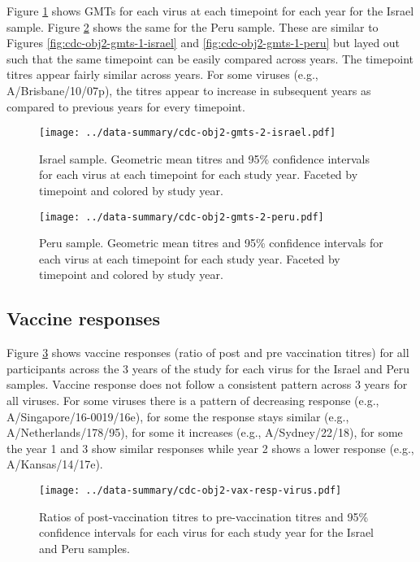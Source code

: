 \documentclass[12pt]{article}
\begin{document}
Figure \ref{fig:cdc-obj2-gmts-2-israel} shows GMTs for each virus at each timepoint for each year for the Israel sample. Figure \ref{fig:cdc-obj2-gmts-2-peru} shows the same for the Peru sample. These are similar to Figures \ref{fig:cdc-obj2-gmts-1-israel} and \ref{fig:cdc-obj2-gmts-1-peru} but layed out such that the same timepoint can be easily compared across years. The timepoint titres appear fairly similar across years. For some viruses (e.g., A/Brisbane/10/07p), the titres appear to increase in subsequent years as compared to previous years for every timepoint.

\begin{figure}
	\texttt{[image: ../data-summary/cdc-obj2-gmts-2-israel.pdf]}
	\caption{Israel sample. Geometric mean titres and 95\% confidence intervals for each virus at each timepoint for each study year. Faceted by timepoint and colored by study year.}
	\label{fig:cdc-obj2-gmts-2-israel}
\end{figure}

\begin{figure}
	\texttt{[image: ../data-summary/cdc-obj2-gmts-2-peru.pdf]}
	\caption{Peru sample. Geometric mean titres and 95\% confidence intervals for each virus at each timepoint for each study year. Faceted by timepoint and colored by study year.}
	\label{fig:cdc-obj2-gmts-2-peru}
\end{figure}

\subsection{Vaccine responses}

Figure \ref{fig:cdc-obj2-vax-resp-virus} shows vaccine responses (ratio of post and pre vaccination titres)
for all participants across the 3 years of the study for each virus for the Israel and Peru samples. Vaccine
response does not follow a consistent pattern across 3 years for all viruses. For some viruses
there is a pattern of decreasing response (e.g., A/Singapore/16-0019/16e), for some the response stays similar (e.g., A/Netherlands/178/95), for some it increases
(e.g., A/Sydney/22/18), for some the year 1 and 3 show similar responses while
year 2 shows a lower response (e.g., A/Kansas/14/17e).

\begin{figure}
	\texttt{[image: ../data-summary/cdc-obj2-vax-resp-virus.pdf]}
	\caption{Ratios of post-vaccination titres to pre-vaccination titres and 95\% confidence intervals for each virus for each study year for the Israel and Peru samples.}
	\label{fig:cdc-obj2-vax-resp-virus}
\end{figure}
\end{document}
